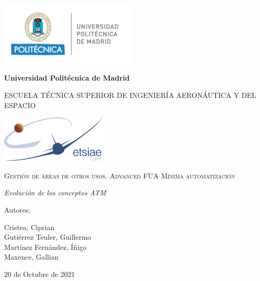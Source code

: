 \documentclass[12pt,a4paper,oneside]{book}
\begin{document}
\begin{titlepage}
\centering
{\includegraphics[width=0.5\textwidth]{logos/UPM}\par}
\vspace{0.1cm}
{\bfseries\LARGE Universidad Politécnica de Madrid \par}
\vspace{0.5cm}
{\scshape\large ESCUELA TÉCNICA SUPERIOR DE INGENIERÍA AERONÁUTICA Y DEL ESPACIO \par}
\vspace{0.25cm}
{\includegraphics[width=0.38\textwidth]{logos/ETSIAE} \par}
\vspace{1cm}
{\scshape\Large  Gestión de áreas de otros usos. Advanced FUA Mínima automatización \par}
\vspace{0.7cm}
{\itshape\large Evolución de los conceptos ATM \par}
\vfill
{\Large Autores: \par}
{\large Cristea, Ciprian \\ Gutiérrez Teuler, Guillermo \\ Martínez Fernández, Íñigo \\ Maxence, Gallian \par}
\vfill
{\Large 20 de Octubre de 2021 \par}
\end{titlepage}

\frontmatter

{\hypersetup{linkcolor=black}		%
	\tableofcontents
	\cleardoublepage
	\listoffigures
	\cleardoublepage
	\listoftables
}

\printglossary[type=\acronymtype,title=Acrónimos,toctitle=Acrónimos]
\end{document}
